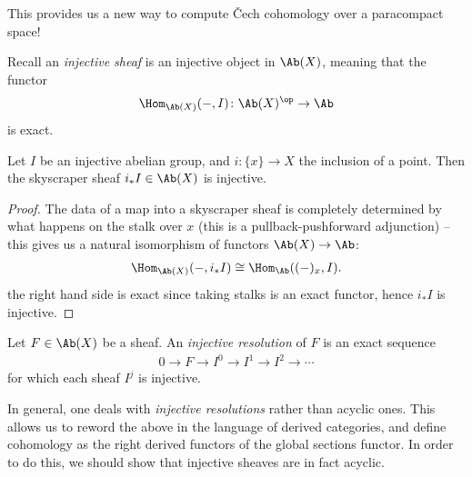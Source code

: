 \documentclass[11pt]{amsart}
\begin{document}
This provides us a new way to compute \v{C}ech cohomology over a paracompact space!

\begin{definition} Recall an \textit{injective sheaf} is an injective object in $\Ab(X)$, meaning that the functor
\begin{align*}
    \Hom_{\Ab(X)}(-,I) \colon \Ab(X)^\op \to \Ab
\end{align*}
is exact.
\end{definition}

\begin{example}\label{exa:skyscraper-injective} 
Let $I$ be an injective abelian group, and $i \colon \{x\} \to X$ the inclusion of a point. Then the skyscraper sheaf $i_\ast I \in \Ab(X)$ is injective.
\end{example}
\begin{proof} The data of a map into a skyscraper sheaf is completely determined by what happens on the stalk over $x$ (this is a pullback-pushforward adjunction) -- this gives us a natural isomorphism of functors $\Ab(X) \to \Ab$:
\begin{align*}
    \Hom_{\Ab(X)}(-, i_\ast I) \cong \Hom_{\Ab}((-)_x, I).
\end{align*}
the right hand side is exact since taking stalks is an exact functor, hence $i_\ast I$ is injective.
\end{proof}

\begin{definition}\label{def:injective-resolution} Let $F\in \Ab(X)$ be a sheaf. An \emph{injective resolution} of $F$ is an exact sequence
\begin{align*}
    0 \to F \to I^0 \to I^1 \to I^2 \to \cdots
\end{align*}
for which each sheaf $I^j$ is injective.
\end{definition}

\begin{remark} In general, one deals with \emph{injective resolutions} rather than acyclic ones. This allows us to reword the above in the language of derived categories, and define cohomology as the right derived functors of the global sections functor. In order to do this, we should show that injective sheaves are in fact acyclic.
\end{remark}
\end{document}
